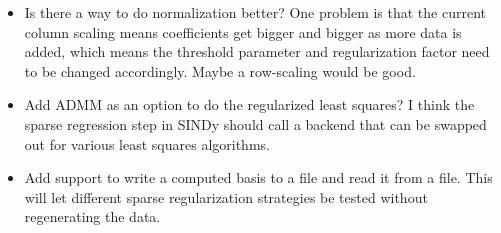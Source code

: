 \documentclass{article}
\begin{document}
\begin{itemize}
    \item Is there a way to do normalization better? One problem is that the
      current column scaling means coefficients get bigger and bigger as more
      data is added, which means the threshold parameter and regularization
      factor need to be changed accordingly. Maybe a row-scaling would be good.

    \item Add ADMM as an option to do the regularized least squares? I think the
      sparse regression step in SINDy should call a backend that can be swapped
      out for various least squares algorithms.

    \item Add support to write a computed basis to a file and read it from a
      file. This will let different sparse regularization strategies be tested
      without regenerating the data.

\end{itemize}




\end{document}
